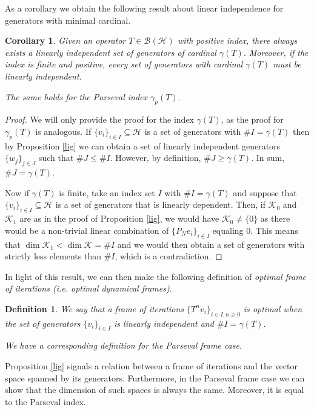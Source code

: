 \documentclass[a4paper,12pt]{amsart}
\def\cB{{\mathcal{B}}}
\def\HH{{\mathcal{H}}}
\def\KK{{\mathcal{K}}}
\newtheorem{corollary}[theorem]{Corollary}
\newtheorem{definition}[theorem]{Definition}
\theoremstyle{definition}
\begin{document}
As a corollary we obtain the following result about linear independence for generators with minimal cardinal.
\begin{corollary}
Given an operator $T\in\cB(\HH)$ with positive index, there always exists a linearly independent set of generators of cardinal $\gamma(T).$
Moreover, if the index is finite and positive, every set of generators with cardinal $\gamma(T)$ must be linearly independent.

The same holds for the Parseval index $\gamma_p(T).$
\end{corollary}
\begin{proof}
We will only provide the proof for the index $\gamma(T)$, as the proof for $\gamma_p(T)$ is analogous. If $\{v_i\}_{i\in I}\subseteq\HH$ is a set of generators with $\#I=\gamma(T)$ then by Proposition \ref{lig} we can obtain a set of linearly independent generators $\{w_j\}_{j\in J}$ such that $\#J\leqslant\#I$. However, by definition, $\#J\geqslant\gamma(T)$. In sum, $\#J=\gamma(T)$.

Now if $\gamma(T)$ is finite, take an index set $I$ with $\#I=\gamma(T)$ and suppose that $\{v_i\}_{i\in I}\subseteq\HH$ is a set of generators that is linearly dependent. Then, if $\KK_0$ and $\KK_1$ are as in the proof of Proposition \ref{lig}, we would have $\KK_0\neq\{0\}$ as there would be a non-trivial linear combination of $\{P_Ne_i\}_{i\in I}$ equaling $0$. This means that $\dim\KK_1<\dim\KK=\#I$ and we would then obtain a set of generators with strictly less elements than $\#I$, which is a contradiction.
\end{proof}

In light of this result, we can then make the following definition of {\em optimal frame of iterations (i.e. optimal dynamical frames)}.

\begin{definition}
We say that a frame of iterations $\{T^nv_i\}_{i\in I,n\geqslant0}$ is {\em optimal} when the set of generators $\{v_i\}_{i\in I}$ is linearly independent and $\#I=\gamma(T)$.

We have a corresponding definition for the Parseval frame case.
\end{definition}

Proposition \ref{lig} signals a relation between a frame of iterations and the vector space spanned by its generators. Furthermore, in the Parseval frame case we can show that the dimension of such spaces is always the same. Moreover, it is equal to the Parseval index.
\end{document}
